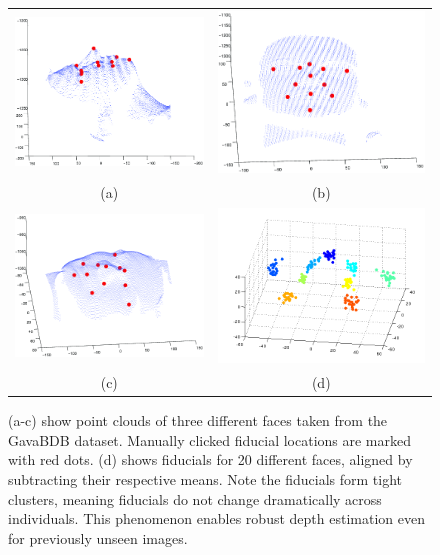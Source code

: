 \documentclass[runningheads]{llncs}
\begin{document}
\begin{figure}[h]
\centering
\begin{tabular}{cc}
\includegraphics[width=.4\linewidth]{resources/figures/face1.png} &
\includegraphics[width=.4\linewidth]{resources/figures/face2.png} \\
(a) & (b) \\
\includegraphics[width=.4\linewidth]{resources/figures/face3.png} &
\includegraphics[width=.6\linewidth]{resources/figures/fiducial_clusters.png} \\
(c) & (d)
\end{tabular}
\caption{
(a-c) show point clouds of three different faces taken from the GavaBDB \cite{moreno2004gavabdb} dataset. 
Manually clicked fiducial locations are marked with red dots.
(d) shows fiducials for 20 different faces, aligned by subtracting their respective means.  
Note the fiducials form tight clusters, meaning fiducials do not change dramatically across individuals.
This phenomenon enables robust depth estimation even for previously unseen images.
}
\label{fig:fiducial_clusters}
\end{figure}
\end{document}
